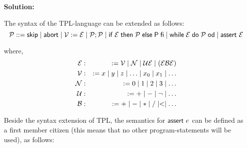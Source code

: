 \newcommand\Ext[2]{\infer[]{#1}{#2}}
\newcommand\PC[2]{\infer[\text{\tiny(pc)}]{#1}{#2}}
\newcommand\TC[2]{\infer[\text{\tiny(tc)}]{#1}{#2}}

\textbf{Solution:}\newline

The syntax of the TPL-language can be extended as follows:%
\begin{equation*}
\mathcal{P}::=\mathsf{skip}\mid \mathsf{abort}\mid \mathcal{V}:=\mathcal{E}%
\mid \mathcal{P};\mathcal{P}\mid \mathsf{if}\;\mathcal{E}\;\mathsf{then}\;%
\mathcal{P}\;\mathsf{else}\;\mathsf{P}\;\mathsf{fi}\mid \mathsf{while}\;%
\mathcal{E}\;\mathsf{do}\;\mathcal{P}\;\mathsf{od}\mid \kw{assert}\ \mathcal{%
E}
\end{equation*}

where,%
\begin{eqnarray*}
\mathcal{E} &:&:=\mathcal{V}\mid \mathcal{N}\mid \mathcal{UE}\mid (\mathcal{%
EBE}) \\
\mathcal{V} &:&:=x\mid y\mid z\mid \ldots \mid x_{0}\mid x_{1}\mid \ldots  \\
\mathcal{N} &:&:=0\mid 1\mid 2\mid 3\mid \ldots  \\
\mathcal{U} &:&:=+\mid -\mid \lnot \mid \ldots  \\
\mathcal{B} &:&:=+\mid -\mid \ast \mid /\mid <\mid \ldots 
\end{eqnarray*}

Beside the syntax extension of TPL, the semantics for $\mbox{\sffamily assert}\ e$ can
be defined as a first member citizen (this means that no other
program-statements will be used), as follows:

